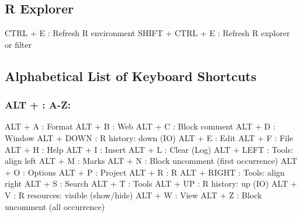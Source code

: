 \newpage
\hypertarget{basic_card_rexplorer}{}
\subsection{R Explorer}

\vspace{-0.5cm}
\begin{Rtables}[caption={[R explorer keyboard shortcuts]
    R explorer keyboard shortcuts},
  label=shortcut:rexplorer]
  CTRL  + E               : Refresh R environment
  SHIFT + CTRL + E        : Refresh R explorer or filter
\end{Rtables}


\hypertarget{basic_card_alphabetical}{}
\subsection{Alphabetical List of Keyboard Shortcuts}


\subsubsection{ALT + : A-Z:}

\vspace{-0.5cm}
\begin{Rtables}[caption={[ALT keyboard shortcuts]
    ALT Keyboard Shortcuts},
  label=shortcut:alt]
  ALT + A                 : Format
  ALT + B                 : Web
  ALT + C                 : Block comment
  ALT + D                 : Window
  ALT + DOWN              : R history: down (IO)
  ALT + E                 : Edit
  ALT + F                 : File
  ALT + H                 : Help
  ALT + I                 : Insert
  ALT + L                 : Clear (Log)
  ALT + LEFT              : Tools: align left
  ALT + M                 : Marks
  ALT + N                 : Block uncomment (first occurrence)
  ALT + O                 : Options
  ALT + P                 : Project
  ALT + R                 : R
  ALT + RIGHT             : Tools: align right
  ALT + S                 : Search
  ALT + T                 : Tools
  ALT + UP                : R history: up (IO)
  ALT + V                 : R resources: visible (show/hide)
  ALT + W                 : View
  ALT + Z                 : Block uncomment (all occurrence)
\end{Rtables}


